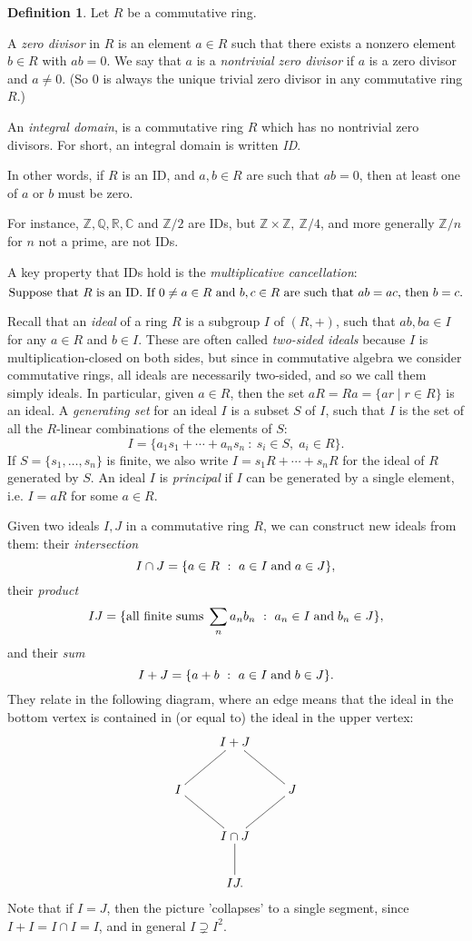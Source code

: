 \documentclass[12pt]{article}
\theoremstyle{definition}
\newtheorem{defn}[thm]{Definition}
\newcounter{ex}\renewcommand\theex{\arabic{ex}}
\newcommand{\Z}{\ensuremath{\mathbb{Z}}}
\newcommand{\Q}{\ensuremath{\mathbb{Q}}}
\newcommand{\R}{\ensuremath{\mathbb{R}}}
\newcommand{\C}{\ensuremath{\mathbb{C}}}
\begin{document}
\begin{defn}\label{def:id}
Let $R$ be a commutative ring.

A {\em zero divisor}
in $R$ is an element $a\in R$ such that there exists a nonzero element
$b\in R$ with $ab=0$. We say that $a$ is a {\em nontrivial zero
divisor} if $a$ is a zero divisor and
$a\neq0$. (So $0$ is always the unique trivial zero divisor in any
commutative ring $R$.)

An {\em integral domain}, is a
commutative ring $R$ which has no nontrivial zero divisors. For short,
an integral domain is written {\em ID}.
\end{defn}


In other words, if $R$ is an ID, and $a,b\in R$ are such that $ab=0$,
then at least one of $a$ or $b$ must be zero.

For instance, $\Z,\Q,\R,\C$ and $\Z/2$ are IDs, but
$\Z\times\Z,~\Z/4$, and more generally $\Z/n$ for $n$ not a prime, are
not IDs. 

A key property that IDs hold is the {\em multiplicative cancellation}:
$$\hbox{Suppose that $R$ is an ID.
If $0\neq a\in R$ and $b,c\in R$ are such that $ab=ac$, then
$b=c$.}$$

\smallskip
Recall that an {\em ideal} of a ring $R$ is a subgroup
$I$ of $(R,+)$, such that $ab,ba\in I$ for any $a\in R$ and
$b\in I$. These are often called {\em two-sided
ideals} because $I$ is multiplication-closed on
both sides, but since in commutative algebra we consider commutative
rings, all ideals are necessarily two-sided, and so we call them
simply ideals. In particular, given $a\in R$, then the set
$aR=Ra=\{ar\mid r\in R\}$ is an ideal.
A {\em generating set} for an ideal $I$ is
a subset $S$ of $I$, such that $I$ is the set of all
the $R$-linear combinations of the elements of $S$:
$$I=\{a_1s_1+\cdots+a_ns_n~:~s_i\in S,\;a_i\in R\}.$$
If $S=\{s_1,\dots,s_n\}$ is finite, we also write $I=s_1R+\cdots+s_nR$
for the ideal of $R$ generated by $S$.
An ideal $I$ is
{\em principal} if $I$ can be generated by a
single element, i.e. $I=aR$ for some $a\in R$.

Given two ideals $I,J$ in a commutative ring $R$, we can construct new
ideals from them: their {\em intersection}
$$I\cap J=\{a\in R~:~a\in I\;\hbox{and}\;a \in J\},$$
their {\em product}
$$IJ=\{\hbox{all finite sums}\;\sum_na_nb_n~:~a_n\in I\;\hbox{and}\;b_n\in J\},$$
and their {\em sum}
$$I+J=\{a+b~:~a\in I\;\hbox{and}\;b\in J\}.$$
They relate in the following diagram, where an edge means that the
ideal in the bottom vertex is contained in (or equal to) the ideal in
the upper vertex: 
$$\xymatrix{&I+J\ar@{-}[dl]\ar@{-}[dr]\\
I\ar@{-}[dr]&&J\ar@{-}[dl]\\
&I\cap J\ar@{-}[d]\\&IJ.}$$
Note that if $I=J$, then the picture 'collapses' to a single segment,
since $I+I=I\cap I=I$, and in general $I\supsetneq I^2$. 
\end{document}
